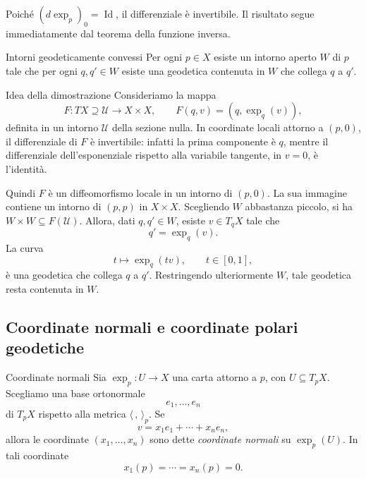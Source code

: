 \documentclass[a4paper]{article}
\begin{document}
\begin{snippetproof}{}
Poiché \((d\exp_p)_0=\operatorname{Id}\), il differenziale è invertibile. Il risultato segue immediatamente dal teorema della funzione inversa.
\end{snippetproof}

\begin{snippetproposition}{Intorni geodeticamente convessi}
Per ogni \(p\in X\) esiste un intorno aperto \(W\) di \(p\) tale che per ogni \(q,q'\in W\) esiste una geodetica contenuta in \(W\) che collega \(q\) a \(q'\).
\end{snippetproposition}

\begin{snippetproof}{Idea della dimostrazione}
Consideriamo la mappa
\[
    F\colon TX\supseteq \mathcal U \longrightarrow X\times X,
    \qquad
    F(q,v)=\left(q,\exp_q(v)\right),
\]
definita in un intorno \(\mathcal U\) della sezione nulla. In coordinate locali attorno a \((p,0)\), il differenziale di \(F\) è invertibile: infatti la prima componente è \(q\), mentre il differenziale dell'esponenziale rispetto alla variabile tangente, in \(v=0\), è l'identità.

Quindi \(F\) è un diffeomorfismo locale in un intorno di \((p,0)\). La sua immagine contiene un intorno di \((p,p)\) in \(X\times X\). Scegliendo \(W\) abbastanza piccolo, si ha \(W\times W\subseteq F(\mathcal U)\). Allora, dati \(q,q'\in W\), esiste \(v\in T_qX\) tale che
\[
    q'=\exp_q(v).
\]
La curva
\[
    t\longmapsto \exp_q(tv), \qquad t\in[0,1],
\]
è una geodetica che collega \(q\) a \(q'\). Restringendo ulteriormente \(W\), tale geodetica resta contenuta in \(W\).
\end{snippetproof}

\subsection{Coordinate normali e coordinate polari geodetiche}

\begin{snippetdefinition}{Coordinate normali}
Sia \(\exp_p\colon U\to X\) una carta attorno a \(p\), con \(U\subseteq T_pX\). Scegliamo una base ortonormale
\[
    e_1,\ldots,e_n
\]
di \(T_pX\) rispetto alla metrica \(\langle\,,\,\rangle_p\). Se
\[
    v=x_1e_1+\cdots+x_ne_n,
\]
allora le coordinate \((x_1,\ldots,x_n)\) sono dette \emph{coordinate normali} su \(\exp_p(U)\). In tali coordinate
\[
    x_1(p)=\cdots=x_n(p)=0.
\]
\end{snippetdefinition}
\end{document}
